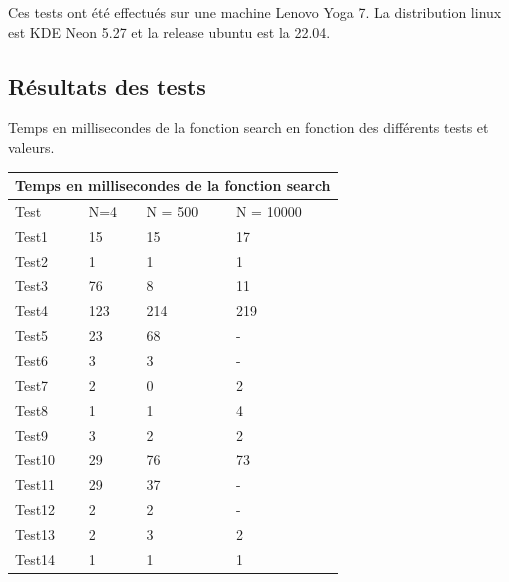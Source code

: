 \documentclass[utf8]{article}
\begin{document}
\begin{large}
    \indent
    \par
    Ces tests ont été effectués sur une machine Lenovo Yoga 7. La distribution
    linux est KDE Neon 5.27 et la release ubuntu est la 22.04.
    \indent

    \subsection{Résultats des tests}
    \indent
    \par
    Temps en millisecondes de la fonction search en fonction des différents tests et valeurs.

    \begin{tabular}{ |p{3cm}||p{3cm}|p{3cm}|p{3cm}|  }
        \hline
        \multicolumn{4}{|c|}{Temps en millisecondes de la fonction search} \\
        \hline
        Test   & N=4 & N = 500 & N = 10000                                 \\
        \hline
        Test1  & 15  & 15      & 17                                        \\
        Test2  & 1   & 1       & 1                                         \\
        Test3  & 76  & 8       & 11                                        \\
        Test4  & 123 & 214     & 219                                       \\
        Test5  & 23  & 68      & -                                         \\
        Test6  & 3   & 3       & -                                         \\
        Test7  & 2   & 0       & 2                                         \\
        Test8  & 1   & 1       & 4                                         \\
        Test9  & 3   & 2       & 2                                         \\
        Test10 & 29  & 76      & 73                                        \\
        Test11 & 29  & 37      & -                                         \\
        Test12 & 2   & 2       & -                                         \\
        Test13 & 2   & 3       & 2                                         \\
        Test14 & 1   & 1       & 1                                         \\


\end{tabular}
\end{large}
\end{document}
